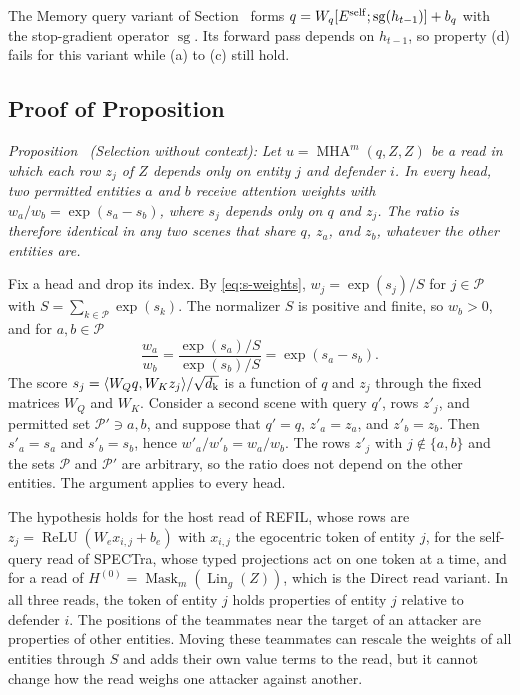 The Memory query variant of Section~ forms $q=W_q[E^{\rm self};\operatorname{sg}(h_{t-1})]+b_q$ with the stop-gradient operator $\operatorname{sg}$. Its forward pass depends on $h_{t-1}$, so property (d) fails for this variant while (a) to (c) still hold.

\subsection{\texorpdfstring{Proof of Proposition~}{Proof of Proposition 1}}
\label{sec:s-proof-selection}

\noindent\textit{Proposition~ (Selection without context):} \textit{Let $u=\operatorname{MHA}^{m}(q,Z,Z)$ be a read in which each row $z_j$ of $Z$ depends only on entity $j$ and defender $i$. In every head, two permitted entities $a$ and $b$ receive attention weights with $w_a/w_b=\exp(s_a-s_b)$, where $s_j$ depends only on $q$ and $z_j$. The ratio is therefore identical in any two scenes that share $q$, $z_a$, and $z_b$, whatever the other entities are.}

\begin{IEEEproof}
Fix a head and drop its index. By \eqref{eq:s-weights}, $w_j=\exp(s_j)/S$ for $j\in\mathcal P$ with $S=\sum_{k\in\mathcal P}\exp(s_k)$. The normalizer $S$ is positive and finite, so $w_b>0$, and for $a,b\in\mathcal P$
\begin{equation*}
\frac{w_a}{w_b}=\frac{\exp(s_a)/S}{\exp(s_b)/S}=\exp(s_a-s_b).
\end{equation*}
The score $s_j=\langle W_Qq,W_Kz_j\rangle/\sqrt{d_{\rm k}}$ is a function of $q$ and $z_j$ through the fixed matrices $W_Q$ and $W_K$. Consider a second scene with query $q'$, rows $z'_j$, and permitted set $\mathcal P'\ni a,b$, and suppose that $q'=q$, $z'_a=z_a$, and $z'_b=z_b$. Then $s'_a=s_a$ and $s'_b=s_b$, hence $w'_a/w'_b=w_a/w_b$. The rows $z'_j$ with $j\notin\{a,b\}$ and the sets $\mathcal P$ and $\mathcal P'$ are arbitrary, so the ratio does not depend on the other entities. The argument applies to every head.
\end{IEEEproof}

The hypothesis holds for the host read of REFIL, whose rows are $z_j=\operatorname{ReLU}(W_ex_{i,j}+b_e)$ with $x_{i,j}$ the egocentric token of entity $j$, for the self-query read of SPECTra, whose typed projections act on one token at a time, and for a read of $H^{(0)}=\operatorname{Mask}_m(\operatorname{Lin}_g(Z))$, which is the Direct read variant. In all three reads, the token of entity $j$ holds properties of entity $j$ relative to defender $i$. The positions of the teammates near the target of an attacker are properties of other entities. Moving these teammates can rescale the weights of all entities through $S$ and adds their own value terms to the read, but it cannot change how the read weighs one attacker against another.

